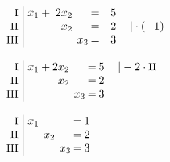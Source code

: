 \begin{equation*}
\begin{array}{l}
\\ \\
\setlength{\arraycolsep}{1pt}
\begin{array}{r|rcrcrcrl}
    \text{\small I } &\; x_{1} & + & 2x_{2} &  &       & = &  5 &                 \\
   \text{\small II } &\;       &   & -x_{2} &  &       & = & -2 & \quad|\cdot(-1) \\
  \text{\small III } &\;       &   &        &  & x_{3} & = &  3 &                   
\end{array}
\\ \\
\setlength{\arraycolsep}{1pt}
\begin{array}{r|rcrcrcrl}
    \text{\small I } &\; x_{1} & + & 2x_{2} &  &       & = & 5 & \quad|-2\cdot\text{\small II} \\
   \text{\small II } &\;       &   &  x_{2} &  &       & = & 2 &                               \\
  \text{\small III } &\;       &   &        &  & x_{3} & = & 3 &                                 
\end{array}
\\ \\
\setlength{\arraycolsep}{1pt}
\begin{array}{r|rcrcrcrl}
    \text{\small I } &\; x_{1} &  &       &  &       & = & 1 & \\
   \text{\small II } &\;       &  & x_{2} &  &       & = & 2 & \\
  \text{\small III } &\;       &  &       &  & x_{3} & = & 3 &   
\end{array}
\end{array}
\end{equation*}

